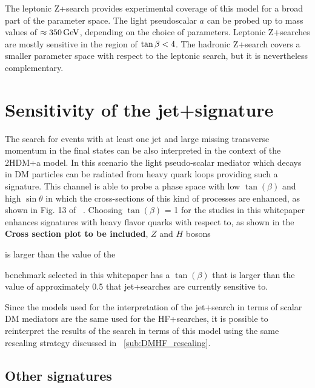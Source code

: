 The leptonic Z+\MET search provides experimental coverage of this model for a broad part of the parameter space. The light pseudoscalar $a$ can be probed up to mass values of $\approx\unit[350]{GeV}$, depending on the choice of parameters. Leptonic Z+\MET searches are mostly sensitive in the region of $\tan\beta<4$. The hadronic Z+\MET search covers a smaller parameter space with respect to the leptonic search, but it is nevertheless complementary.

\FloatBarrier

\section{Sensitivity of the jet+\MET signature}

The search for events with at least one jet and large missing transverse momentum in the final states can be also interpreted in the context of the 2HDM+a model. In this scenario the light pseudo-scalar mediator which decays in DM particles can be radiated from heavy quark loops providing such a signature. This channel is able to probe a phase space with low $\tan(\beta)$ and high $\sin\theta$ in which the cross-sections of this kind of processes are enhanced, as shown in Fig. 13 of ~\cite{Bauer:2017ota}. Choosing $\tan(\beta)$ = 1 for the studies in this whitepaper enhances signatures with heavy flavor quarks with respect to, as shown in the \textbf{Cross section plot to be included}, $Z$ and $H$ bosons

is larger than the value of the  

benchmark selected in this whitepaper has a $\tan(\beta)$ that is larger than the value of approximately 0.5 that jet+\MET searches are currently sensitive to.

Since the models used for the interpretation of the jet+\MET search in terms of scalar DM mediators are the same used for the HF+\MET searches, it is possible to reinterpret the results of the search in terms of this model using the same rescaling strategy discussed in ~\autoref{sub:DMHF_rescaling}. 

%

\subsection{Other signatures}


